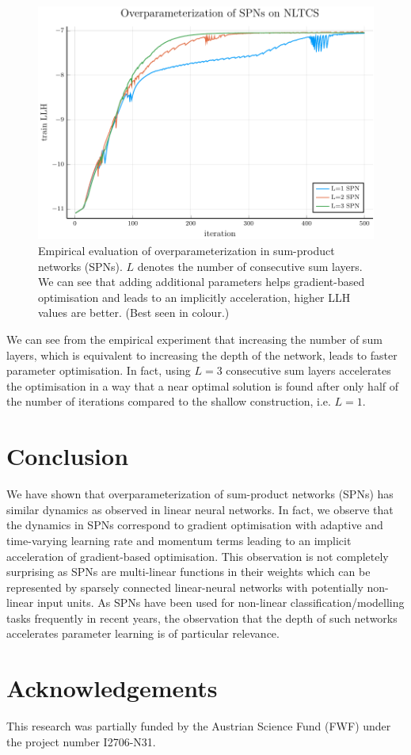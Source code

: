 \documentclass{article}
\begin{document}
\begin{figure}[t]
  \includegraphics[width=\linewidth]{nltcs_experiment}
  \caption{Empirical evaluation of overparameterization in sum-product networks (SPNs). $L$ denotes the number of consecutive sum layers. We can see that adding additional parameters helps gradient-based optimisation and leads to an implicitly acceleration, higher LLH values are better. (Best seen in colour.)}
  \label{fig:experiment}
\end{figure}

We can see from the empirical experiment that increasing the number of sum layers, which is equivalent to increasing the depth of the network, leads to faster parameter optimisation.
In fact, using $L=3$ consecutive sum layers accelerates the optimisation in a way that a near optimal solution is found after only half of the number of iterations compared to the shallow construction, i.e. $L=1$.

\section{Conclusion} \label{sec:conclusion}
We have shown that overparameterization of sum-product networks (SPNs) has similar dynamics as observed in linear neural networks.
In fact, we observe that the dynamics in SPNs correspond to gradient optimisation with adaptive and time-varying learning rate and momentum terms leading to an implicit acceleration of gradient-based optimisation.
This observation is not completely surprising as SPNs are multi-linear functions in their weights which can be represented by sparsely connected linear-neural networks with potentially non-linear input units.
As SPNs have been used for non-linear classification/modelling tasks frequently in recent years, the observation that the depth of such networks accelerates parameter learning is of particular relevance.

\section*{Acknowledgements}
This research was partially funded by the Austrian Science Fund (FWF) under the project number I2706-N31.



\end{document}
